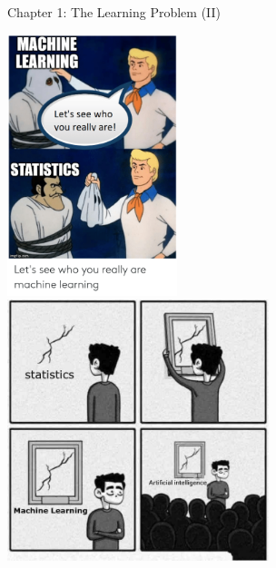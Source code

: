 \documentclass[10pt]{exam}
\theoremstyle{definition}
\newtheorem{problem}{Problem}
\newtheorem{note}{Note}
\begin{document}
\begin{center}
{
\Huge
Chapter 1: The Learning Problem (II)
}
\end{center}

\begin{center}
\includegraphics[height=3in]{scooby}
~~~~~~~~~~
\includegraphics[height=3in]{ml}
\end{center}

%

%
\end{document}
